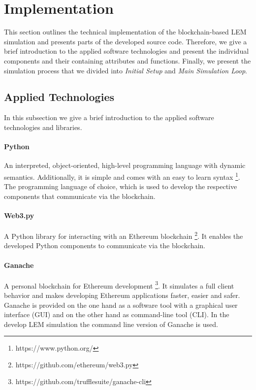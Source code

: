 \section{Implementation}
\label{sec:implementation}

This section outlines the technical implementation of the blockchain-based LEM simulation
and presents parts of the developed source code. Therefore, we give a brief introduction to the applied 
software technologies and present the individual components and their containing attributes and functions.
Finally, we present the simulation process that we divided into \textit{Initial Setup} and \textit{Main Simulation Loop}. 

\subsection{Applied Technologies}
\label{sec:applied_technologies}
In this subsection we give a brief introduction 
to the applied software technologies and libraries.

\paragraph{Python}
An interpreted, object-oriented, high-level programming language with dynamic semantics. 
Additionally, it is simple and comes with an easy to learn syntax \footnote{https://www.python.org/}.
The programming language of choice, which is used to develop the 
respective components that communicate via the blockchain.

\paragraph{Web3.py}
A Python library for interacting with an Ethereum blockchain \footnote{https://github.com/ethereum/web3.py}. 
It enables the developed Python components to communicate via the blockchain.

\paragraph{Ganache}
A personal blockchain for Ethereum development \footnote{https://github.com/trufflesuite/ganache-cli}.
It simulates a full client behavior and makes developing Ethereum applications faster, easier and safer.
Ganache is provided on the one hand as a software tool with a graphical user interface (GUI) and on the other hand as command-line tool (CLI). In the develop LEM simulation the command line version of Ganache is used. 

